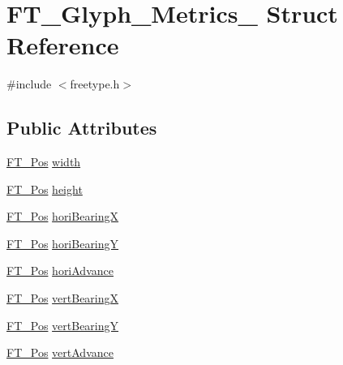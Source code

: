 \hypertarget{struct_f_t___glyph___metrics__}{}\section{F\+T\+\_\+\+Glyph\+\_\+\+Metrics\+\_\+ Struct Reference}
\label{struct_f_t___glyph___metrics__}


{\ttfamily \#include $<$freetype.\+h$>$}

\subsection*{Public Attributes}
\begin{DoxyCompactItemize}
\item 
\mbox{\hyperlink{ftimage_8h_af5f230f4b253d4c7715fd2e595614c90}{F\+T\+\_\+\+Pos}} \mbox{\hyperlink{struct_f_t___glyph___metrics___a0ff1be869e6a28d1f2990b0e5719dca9}{width}}
\item 
\mbox{\hyperlink{ftimage_8h_af5f230f4b253d4c7715fd2e595614c90}{F\+T\+\_\+\+Pos}} \mbox{\hyperlink{struct_f_t___glyph___metrics___aa2a76ec448ec9d18acf343f01b77cb21}{height}}
\item 
\mbox{\hyperlink{ftimage_8h_af5f230f4b253d4c7715fd2e595614c90}{F\+T\+\_\+\+Pos}} \mbox{\hyperlink{struct_f_t___glyph___metrics___a2afc877f52c8a8910ec144a1948186cc}{hori\+BearingX}}
\item 
\mbox{\hyperlink{ftimage_8h_af5f230f4b253d4c7715fd2e595614c90}{F\+T\+\_\+\+Pos}} \mbox{\hyperlink{struct_f_t___glyph___metrics___afd97c10d43ed1f66598a18884468b536}{hori\+BearingY}}
\item 
\mbox{\hyperlink{ftimage_8h_af5f230f4b253d4c7715fd2e595614c90}{F\+T\+\_\+\+Pos}} \mbox{\hyperlink{struct_f_t___glyph___metrics___af12db260a90b8a7c938ad48ebf20ccbe}{hori\+Advance}}
\item 
\mbox{\hyperlink{ftimage_8h_af5f230f4b253d4c7715fd2e595614c90}{F\+T\+\_\+\+Pos}} \mbox{\hyperlink{struct_f_t___glyph___metrics___aead5c5637b983b811738bff3bcea8cea}{vert\+BearingX}}
\item 
\mbox{\hyperlink{ftimage_8h_af5f230f4b253d4c7715fd2e595614c90}{F\+T\+\_\+\+Pos}} \mbox{\hyperlink{struct_f_t___glyph___metrics___a7f1aba91b86fddeb11030eab15dcce08}{vert\+BearingY}}
\item 
\mbox{\hyperlink{ftimage_8h_af5f230f4b253d4c7715fd2e595614c90}{F\+T\+\_\+\+Pos}} \mbox{\hyperlink{struct_f_t___glyph___metrics___a594f43c64fe5c12a399a0f0a47c04990}{vert\+Advance}}
\end{DoxyCompactItemize}


